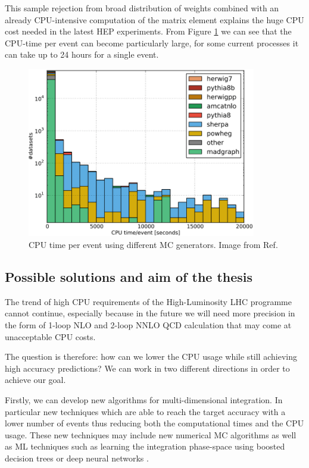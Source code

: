\documentclass[../main/main.tex]{subfiles}
\begin{document}
This sample rejection from broad distribution of weights combined with an already CPU-intensive computation of the matrix element explains the huge CPU cost needed in the latest HEP experiments.  From Figure \ref{CPU-time} we can see that the CPU-time per event can become particularly large,  for some current processes it can take up to 24 hours for a single event.


\begin{figure}[]
	\centering
	\includegraphics[width = 10cm]{../images/CPU-time.png}
	\caption{CPU time per event using different MC generators. Image from Ref\cite{Buckley:2019wov}.}
	\label{CPU-time}
\end{figure}


\subsection{Possible solutions and aim of the thesis}

The trend of high CPU requirements of the High-Luminosity LHC programme cannot continue, especially because in the future we will need
more precision in the form of 1-loop NLO and 2-loop NNLO QCD calculation that may come at unacceptable CPU costs.

The question is therefore: how can we lower the CPU usage while still achieving high accuracy predictions?
We can work in two different directions in order to achieve our goal.

Firstly, we can develop new algorithms for multi-dimensional integration. In particular new techniques which are able to reach the target accuracy
with a lower number of events thus reducing both the computational times and the CPU usage. These new techniques may include new numerical
MC algorithms as well as ML techniques such as  learning the integration phase-space using boosted decision trees \cite{Bendavid:2017zhk} or deep neural networks \cite{unknown}. 
\end{document}

